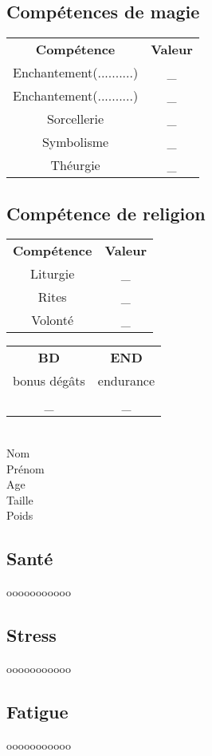 \documentclass[10pt,a4paper]{article}
\begin{document}
\begin{multicols}{3}
  \subsection*{Compétences de magie}
  \begin{tabular}{cc}
  \textbf{Compétence}& \textbf{Valeur}\\
  Enchantement(..........)& \_\\
  Enchantement(..........)& \_\\
  Sorcellerie& \_\\
  Symbolisme& \_\\
  Théurgie& \_\\
  \end{tabular}
  \subsection*{Compétence de religion}
  \begin{tabular}{cc}
  \textbf{Compétence}& \textbf{Valeur}\\
  Liturgie& \_\\
  Rites& \_\\
  Volonté& \_\\
  \end{tabular}
  \columnbreak
  
  \begin{tabular}{cc}
  \textbf{BD} & \textbf{END} \\
  \small bonus dégâts & \small endurance\\
  \_ & \_ 
  \end{tabular}
  \\
  Nom \\
  Prénom \\
  Age \\
  Taille \\
  Poids \\
  \subsection*{Santé}
  \centering
  ooooooooooo
  \subsection*{Stress}
  \centering
  ooooooooooo
  \subsection*{Fatigue}
  \centering
  ooooooooooo
  

\end{multicols}
\end{document}
